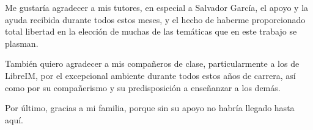 Me gustaría agradecer a mis tutores, en especial a Salvador García, el apoyo y la ayuda recibida durante
todos estos meses, y el hecho de haberme proporcionado total libertad en la elección de muchas de las temáticas que en 
este trabajo se plasman.

También quiero agradecer a mis compañeros de clase, particularmente a los de LibreIM, por el excepcional ambiente 
durante todos estos años de carrera, así como por su compañerismo y su predisposición a enseñanzar a los demás.

Por último, gracias a mi familia, porque sin su apoyo no habría llegado hasta aquí.